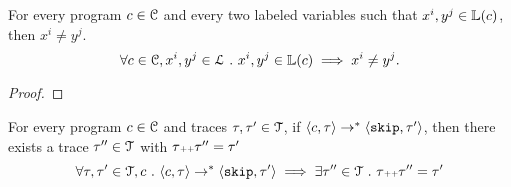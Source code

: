 \begin{lem}
    For every program $c \in \mathcal{C}$ and every two labeled variables such that
    $x^i, y^j \in \mathbb{L}(c)$, then $x^i \neq y^j$.
    \[
      \forall c \in \mathcal{C}, x^i, y^j \in \mathcal{L} ~.~ x^i, y^j \in \mathbb{L}(c)\implies x^i \neq y^j.
      \]
  \end{lem}
  \begin{proof}
  \end{proof}
  \begin{lem}
    For every program $c \in \mathcal{C}$ and traces $\mathtt{\tau}, \mathtt{\tau}' \in \mathcal{T}$, if 
    $\langle c, \mathtt{\tau} \rangle \rightarrow^{*} \langle \mathtt{skip}, \mathtt{\tau}' \rangle$,
    then there exists a trace $\mathtt{\tau}'' \in \mathcal{T}$ with $\mathtt{\tau} {\scriptscriptstyle ++} \mathtt{\tau}'' = \mathtt{\tau}'$
    $$
    \forall \mathtt{\tau}, \mathtt{\tau}' \in \mathcal{T}, c ~.~
    \langle c, \mathtt{\tau} \rangle \rightarrow^{*} \langle \mathtt{skip}, \mathtt{\tau}' \rangle 
    \implies \exists \mathtt{\tau}'' \in \mathcal{T} ~.~ \mathtt{\tau} {\scriptscriptstyle ++} \mathtt{\tau}'' = \mathtt{\tau}'
    $$
    \end{lem}
